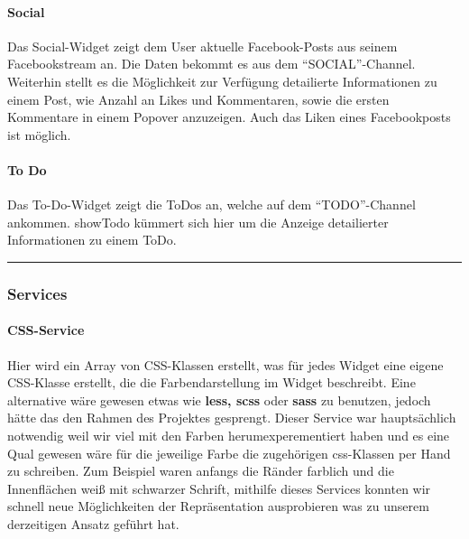 \documentclass[10pt,a4paper]{report}
\newcommand{\code}[1]{{\fontfamily{cmvtt}\selectfont #1}}
\newcommand{\HRule}{\rule{\linewidth}{0.1pt}} %
\begin{document}
				\paragraph{Social}
					Das Social-Widget zeigt dem User aktuelle Facebook-Posts aus seinem Facebookstream an. Die Daten bekommt es aus dem "`SOCIAL"'-Channel. Weiterhin stellt es die Möglichkeit zur Verfügung detailierte Informationen zu einem Post, wie Anzahl an Likes und Kommentaren, sowie die ersten Kommentare in einem Popover anzuzeigen. Auch das Liken eines Facebookposts ist möglich.
				\paragraph{To Do}
					Das To-Do-Widget zeigt die ToDos an, welche auf dem "`TODO"'-Channel ankommen. \code{showTodo} kümmert sich hier um die Anzeige detailierter Informationen zu einem ToDo.\\
				\HRule
			\subsubsection{Services}
				\paragraph{CSS-Service}
					Hier wird ein Array von CSS-Klassen erstellt, was für jedes Widget eine eigene CSS-Klasse erstellt, die die Farbendarstellung im Widget beschreibt.
					Eine alternative wäre gewesen etwas wie \textbf{less, scss} oder \textbf{sass} zu benutzen, jedoch hätte das den Rahmen des Projektes gesprengt.
					Dieser Service war hauptsächlich notwendig weil wir viel mit den Farben herumexperementiert haben und es eine Qual gewesen wäre für die jeweilige Farbe die zugehörigen css-Klassen per Hand zu schreiben. Zum Beispiel waren anfangs die Ränder farblich und die Innenflächen weiß mit schwarzer Schrift, mithilfe dieses Services konnten wir schnell neue Möglichkeiten der Repräsentation ausprobieren was zu unserem derzeitigen Ansatz geführt hat.
\end{document}
